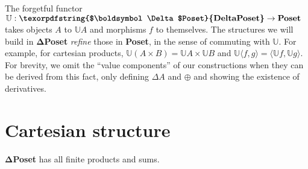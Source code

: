 \documentclass{rntz}\usepackage[a5]{rntzgeometry}\usepackage[fullwidth=13cm,width=320pt,width=115mm]{narrow}
\newcommand\cat\textbf
\newcommand\CP{\cat{\texorpdfstring{$\boldsymbol\Delta$Poset}{DeltaPoset}}}
\newcommand\Poset{\cat{Poset}}
\newcommand\D\Delta
\newcommand\x\times
\newcommand\<{\mskip 4mu plus 4mu minus 1mu}
\newcommand\valfn{\ensuremath{\mathbb{U}}}
\newcommand\vals{\valfn}
\newcommand\chgs[1]{\D{#1}}
\newcommand\fork[1]{\langle{#1}\rangle}
\begin{document}
The forgetful functor $\valfn : \CP \to \Poset$ takes objects $A$ to $\vals{A}$
and morphisms $f$ to themselves. The structures we will build in \CP{}
\emph{refine} those in \Poset{}, in the sense of commuting with $\valfn$. For
example, for cartesian products, $\vals{(A \x B)} = \vals{A} \x \vals{B}$ and
$\vals{\fork{f,g}} = \fork{\vals f, \vals g}$.
%
For brevity, we omit the ``value components'' of our constructions when they can
be derived from this fact, only defining $\chgs{A}$ and $\oplus$ and showing the
existence of derivatives.


\section{Cartesian structure}

\begin{theorem}
  \CP{} has all finite products and sums.
\end{theorem}
\end{document}
